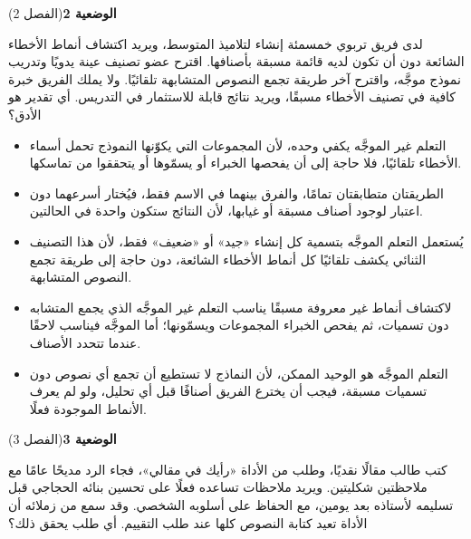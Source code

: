 \documentclass[11pt,a4paper]{article}
\begin{document}
\par\vspace{6pt}
\noindent
{\large\khatt\textbf{الوضعية 2}}\hfill{\small(الفصل 2)}\par\nopagebreak\vspace{3pt}
\setlength{\fboxsep}{7pt}\colorbox{gray!10}{\parbox{\dimexpr\linewidth-14pt}{لدى فريق تربوي خمسمئة إنشاء لتلاميذ المتوسط، ويريد اكتشاف أنماط الأخطاء الشائعة دون أن تكون لديه قائمة مسبقة بأصنافها. اقترح عضو تصنيف عينة يدويًا وتدريب نموذج موجَّه، واقترح آخر طريقة تجمع النصوص المتشابهة تلقائيًا. ولا يملك الفريق خبرة كافية في تصنيف الأخطاء مسبقًا، ويريد نتائج قابلة للاستثمار في التدريس. أي تقدير هو الأدق؟}}\par\nopagebreak
\begin{itemize}[leftmargin=1.0cm, labelsep=6pt, itemsep=3pt, topsep=4pt, parsep=0pt]
  \item[\textbf{أ)}] التعلم غير الموجَّه يكفي وحده، لأن المجموعات التي يكوّنها النموذج تحمل أسماء الأخطاء تلقائيًا، فلا حاجة إلى أن يفحصها الخبراء أو يسمّوها أو يتحققوا من تماسكها.
  \item[\textbf{ب)}] الطريقتان متطابقتان تمامًا، والفرق بينهما في الاسم فقط، فيُختار أسرعهما دون اعتبار لوجود أصناف مسبقة أو غيابها، لأن النتائج ستكون واحدة في الحالتين.
  \item[\textbf{ج)}] يُستعمل التعلم الموجَّه بتسمية كل إنشاء «جيد» أو «ضعيف» فقط، لأن هذا التصنيف الثنائي يكشف تلقائيًا كل أنماط الأخطاء الشائعة، دون حاجة إلى طريقة تجمع النصوص المتشابهة.
  \item[\textbf{د)}] لاكتشاف أنماط غير معروفة مسبقًا يناسب التعلم غير الموجَّه الذي يجمع المتشابه دون تسميات، ثم يفحص الخبراء المجموعات ويسمّونها؛ أما الموجَّه فيناسب لاحقًا عندما تتحدد الأصناف.
  \item[\textbf{هـ)}] التعلم الموجَّه هو الوحيد الممكن، لأن النماذج لا تستطيع أن تجمع أي نصوص دون تسميات مسبقة، فيجب أن يخترع الفريق أصنافًا قبل أي تحليل، ولو لم يعرف الأنماط الموجودة فعلًا.
\end{itemize}
\par\vspace{6pt}
\noindent
{\large\khatt\textbf{الوضعية 3}}\hfill{\small(الفصل 3)}\par\nopagebreak\vspace{3pt}
\setlength{\fboxsep}{7pt}\colorbox{gray!10}{\parbox{\dimexpr\linewidth-14pt}{كتب طالب مقالًا نقديًا، وطلب من الأداة «رأيك في مقالي»، فجاء الرد مديحًا عامًا مع ملاحظتين شكليتين. ويريد ملاحظات تساعده فعلًا على تحسين بنائه الحجاجي قبل تسليمه لأستاذه بعد يومين، مع الحفاظ على أسلوبه الشخصي. وقد سمع من زملائه أن الأداة تعيد كتابة النصوص كلها عند طلب التقييم. أي طلب يحقق ذلك؟}}\par\nopagebreak
\end{document}
